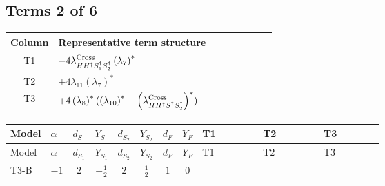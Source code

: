 \documentclass[8pt]{article}
\begin{document}
\begin{landscape}
\subsection*{Terms 2 of 6}
\begin{center}
\begin{tabular}{@{}c >{\raggedright\arraybackslash}p{0.82\linewidth}@{}}
\toprule
Column & Representative term structure \\
\midrule
T1 & \(\displaystyle -4 {\lambda_{H H^\dagger S_1^\dagger S_2^\dagger}^{\rm Cross}} \left({\lambda_{7}}\right)^{*}\) \\
\midrule
T2 & \(\displaystyle +4 {\lambda_{11}} \left({\lambda_{7}}\right)^{*}\) \\
\midrule
T3 & \(\displaystyle +4 \left({\lambda_{8}}\right)^{*} (\left({\lambda_{10}}\right)^{*}-\left({\lambda_{H H^\dagger S_1^\dagger S_2^\dagger}^{\rm Cross}}\right)^{*})\) \\
\midrule
\bottomrule
\end{tabular}
\end{center}
\smallskip
\tiny
\begin{longtable}{@{}llcccccc >{\raggedright\arraybackslash}p{0.21\linewidth} >{\raggedright\arraybackslash}p{0.21\linewidth} >{\raggedright\arraybackslash}p{0.21\linewidth}@{}}
\toprule
Model & $\alpha$ & $d_{S_1}$ & $Y_{S_1}$ & $d_{S_2}$ & $Y_{S_2}$ & $d_F$ & $Y_F$ & T1 & T2 & T3 \\
\midrule
\endfirsthead
\toprule
Model & $\alpha$ & $d_{S_1}$ & $Y_{S_1}$ & $d_{S_2}$ & $Y_{S_2}$ & $d_F$ & $Y_F$ & T1 & T2 & T3 \\
\midrule
\endhead
T3-B & $-1$ & $2$ & $-\frac{1}{2}$ & $2$ & $\frac{1}{2}$ & $1$ & $0$ & \scriptsize\adjustbox{max width=\linewidth}{$\begin{gathered} -4 {\lambda_{H H^\dagger S_1^\dagger S_2^\dagger}^{\rm Cross}} \left({\lambda_{7}}\right)^{*}\end{gathered}$} & \scriptsize\adjustbox{max width=\linewidth}{$\begin{gathered} +4 {\lambda_{11}} \left({\lambda_{7}}\right)^{*}\end{gathered}$} & \scriptsize\adjustbox{max width=\linewidth}{$\begin{gathered} +4 \left({\lambda_{8}}\right)^{*} (\left({\lambda_{10}}\right)^{*}-\left({\lambda_{H H^\dagger S_1^\dagger S_2^\dagger}^{\rm Cross}}\right)^{*})\end{gathered}$} \\
\midrule

\end{longtable}
\end{landscape}
\end{document}
